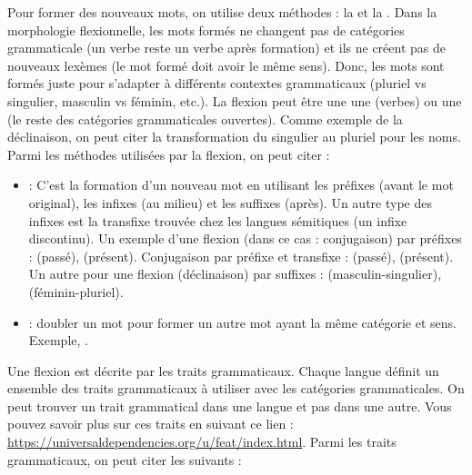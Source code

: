 \documentclass{KodeBook}
\begin{document}
Pour former des nouveaux mots, on utilise deux méthodes : la  et la . 
Dans la morphologie flexionnelle, les mots formés ne changent pas de catégories grammaticale (un verbe reste un verbe après formation) et ils ne créent pas de nouveaux lexèmes (le mot formé doit avoir le même sens). 
Donc, les mots sont formés juste pour s'adapter à différents contextes grammaticaux (pluriel vs singulier, masculin vs féminin, etc.).
La flexion peut être une une  (verbes) ou une  (le reste des catégories grammaticales ouvertes).
Comme exemple de la déclinaison, on peut citer la transformation du singulier au pluriel pour les noms.
Parmi les méthodes utilisées par la flexion, on peut citer :
\begin{itemize}
	\item {} : C'est la formation d'un nouveau mot en utilisant les préfixes (avant le mot original), les infixes (au milieu) et les suffixes (après).
	Un autre type des infixes est la transfixe trouvée chez les langues sémitiques (un infixe discontinu).
	Un exemple d'une flexion (dans ce cas : conjugaison) par préfixes :  (passé),  (présent).
	Conjugaison par préfixe et transfixe :  (passé),  (présent).
	Un autre pour une flexion (déclinaison) par suffixes :  (masculin-singulier),  (féminin-pluriel).
	\item {} : doubler un mot pour former un autre mot ayant la même catégorie et sens. 
	Exemple, .
	
\end{itemize}
Une flexion est décrite par les traits grammaticaux. 
Chaque langue définit un ensemble des traits grammaticaux à utiliser avec les catégories grammaticales.
On peut trouver un trait grammatical dans une langue et pas dans une autre.
Vous pouvez savoir plus sur ces traits en suivant ce lien : \url{https://universaldependencies.org/u/feat/index.html}.
Parmi les traits grammaticaux, on peut citer les suivants :
\end{document}
